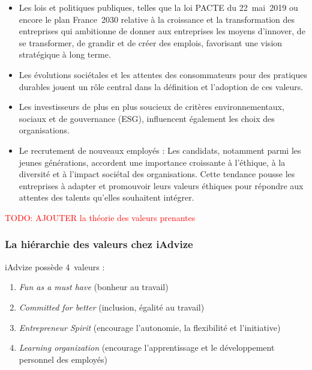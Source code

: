 \documentclass[12pt,a4paper]{report}
\begin{document}
\begin{itemize}
    \item Les lois et politiques publiques, telles que la loi PACTE du 22~mai~2019 ou encore le plan France~2030 relative à la croissance et la transformation des entreprises qui ambitionne de donner aux entreprises les moyens d'innover, de se transformer, de grandir et de créer des emplois, favorisant une vision stratégique à long terme.\\
    
    \item Les évolutions sociétales et les attentes des consommateurs pour des pratiques durables jouent un rôle central dans la définition et l'adoption de ces valeurs.\\

    \item Les investisseurs de plus en plus soucieux de critères environnementaux, sociaux et de gouvernance (ESG), influencent également les choix des organisations.\\
    
    \item Le recrutement de nouveaux employés : Les candidats, notamment parmi les jeunes générations, accordent une importance croissante à l'éthique, à la diversité et à l'impact sociétal des organisations. Cette tendance pousse les entreprises à adapter et promouvoir leurs valeurs éthiques pour répondre aux attentes des talents qu'elles souhaitent intégrer.\\
\end{itemize}

\textcolor{red}{TODO: AJOUTER la théorie des valeurs prenantes}

\subsubsection{La hiérarchie des valeurs chez iAdvize}

iAdvize possède 4~valeurs :

\begin{enumerate}
    \item \textit{Fun as a must have} (bonheur au travail)\\
    \item \textit{Committed for better} (inclusion, égalité au travail)\\
    \item \textit{Entrepreneur Spirit} (encourage l'autonomie, la flexibilité et l'initiative)\\
    \item \textit{Learning organization} (encourage l'apprentissage et le développement personnel des employés)\\
\end{enumerate}
\end{document}
